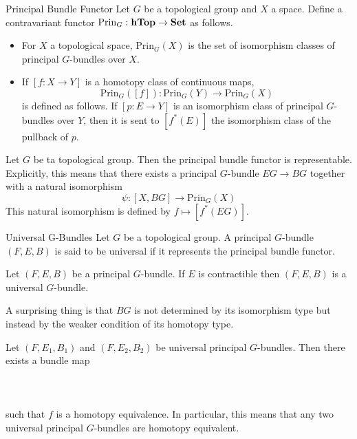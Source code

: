 \documentclass[a4paper]{article}
\begin{document}
\begin{defn}{Principal Bundle Functor}{} Let $G$ be a topological group and $X$ a space. Define a contravariant functor $\text{Prin}_G:\bold{hTop}\to\bold{Set}$ as follows. 
\begin{itemize}
\item For $X$ a topological space, $\text{Prin}_G(X)$ is the set of isomorphism classes of principal $G$-bundles over $X$. 
\item If $[f:X\to Y]$ is a homotopy class of continuous maps, $$\text{Prin}_G([f]):\text{Prin}_G(Y)\to\text{Prin}_G(X)$$ is defined as follows. If $[p:E\to Y]$ is an isomorphism class of principal $G$-bundles over $Y$, then it is sent to $[f^\ast(E)]$ the isomorphism class of the pullback of $p$. 
\end{itemize}
\end{defn}

\begin{thm}{}{} Let $G$ be ta topological group. Then the principal bundle functor is representable. Explicitly, this means that there exists a principal $G$-bundle $EG\to BG$ together with a natural isomorphism $$\psi:[X,BG]\to\text{Prin}_G(X)$$ This natural isomorphism is defined by $f\mapsto[f^\ast(EG)]$. 
\end{thm}

\begin{defn}{Universal G-Bundles}{} Let $G$ be a topological group. A principal $G$-bundle $(F,E,B)$ is said to be universal if it represents the principal bundle functor. 
\end{defn}

\begin{thm}{}{} Let $(F,E,B)$ be a principal $G$-bundle. If $E$ is contractible then $(F,E,B)$ is a universal $G$-bundle. 
\end{thm}

A surprising thing is that $BG$ is not determined by its isomorphism type but instead by the weaker condition of its homotopy type. 

\begin{thm}{}{} Let $(F,E_1,B_1)$ and $(F,E_2,B_2)$ be universal principal $G$-bundles. Then there exists a bundle map \\~\\
\\~\\
such that $f$ is a homotopy equivalence. In particular, this means that any two universal principal $G$-bundles are homotopy equivalent. 
\end{thm}
\end{document}
